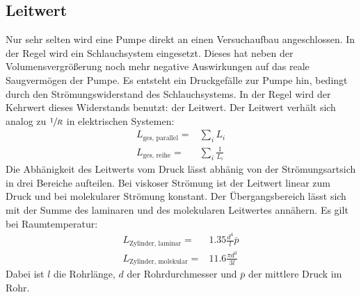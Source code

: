 \subsection{Leitwert}
Nur sehr selten wird eine Pumpe direkt an einen Versuchaufbau angeschlossen. In der Regel wird ein Schlauchsystem eingesetzt. Dieses hat neben der Volumensvergrößerung
noch mehr negative Auswirkungen auf das reale Saugvermögen der Pumpe. Es entsteht ein Druckgefälle zur Pumpe hin, bedingt durch den Strömungswiderstand des Schlauchsystems. In der Regel wird der Kehrwert dieses Widerstands benutzt: der Leitwert. Der Leitwert verhält sich analog zu $\sfrac{1}{R}$ in elektrischen
Systemen:
\begin{align}
	L_\text{ges, parallel}=&\sum_i L_i \\
	L_\text{ges, reihe}=&\sum_i \frac{1}{L_i}
\end{align}
Die Abhänigkeit des Leitwerts vom Druck lässt abhänig von der Strömungsartsich in drei Bereiche aufteilen. Bei viskoser Strömung ist der Leitwert linear zum
Druck und bei molekularer Strömung konstant. Der Übergangsbereich lässt sich mit der Summe des laminaren und des molekularen Leitwertes annähern.
Es gilt bei Raumtemperatur:
\begin{align}
	L_\text{Zylinder, laminar}=& \num{1.35}\frac{d^4}{l}\overline{p} \\
	L_\text{Zylinder, molekular}=& \num{11.6}\frac{\pi d^3}{3l}
\end{align}
Dabei ist $l$ die Rohrlänge, $d$ der Rohrdurchmesser und $\overline{p}$ der mittlere Druck im Rohr.
